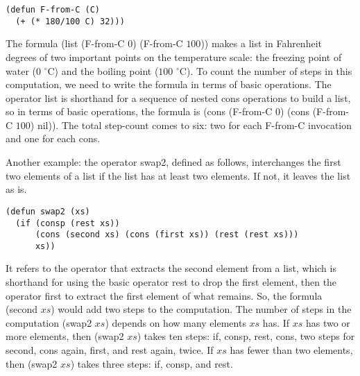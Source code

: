 \begin{code}
\begin{verbatim}
(defun F-from-C (C)
  (+ (* 180/100 C) 32)))
\end{verbatim}
\end{code}

The formula \textsf{(list (F-from-C $0$) (F-from-C $100$))}
makes a list in Fahrenheit degrees of two important
points on the temperature scale:
the freezing point of water ($0$ $^\circ$C) and the boiling point ($100$ $^\circ$C).
To count the number of steps in this computation,
we need to write the formula in terms of basic operations.
The operator \textsf{list} is shorthand for a sequence of nested
\textsf{cons} operations to build a list,
so in terms of basic operations, the formula is
\textsf{(cons (F-from-C $0$) (cons (F-from-C $100$) nil))}.
The total step-count comes to six: two for each \textsf{F-from-C} invocation
and one for each cons.

Another example:
the operator \textsf{swap2}, defined as follows, interchanges the
first two elements of a list if the list has at least two elements.
If not, it leaves the list as is.

\begin{code}
\begin{verbatim}
(defun swap2 (xs)
  (if (consp (rest xs))
      (cons (second xs) (cons (first xs)) (rest (rest xs)))
      xs))
\end{verbatim}
\end{code}

It refers to the operator that extracts the second element from a list,
which is shorthand for using the basic operator \textsf{rest} to drop the
first element, then the operator \textsf{first} to extract the first element
of what remains.
\label{steps-in-second-op}So,
the formula \textsf{(second $xs$)} would add two steps
to the computation. The number of steps in the computation \textsf{(swap2 $xs$)}
depends on how many elements $xs$ has. If $xs$ has two or more elements,
then \textsf{(swap2 $xs$)} takes ten steps:
\textsf{if}, \textsf{consp}, \textsf{rest}, \textsf{cons},
two steps for \textsf{second},
\textsf{cons} again, \textsf{first}, and \textsf{rest} again, twice.
If $xs$ has fewer than two elements, then \textsf{(swap2 $xs$)} takes three steps:
\textsf{if}, \textsf{consp}, and \textsf{rest}.

